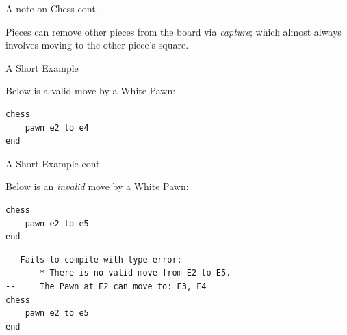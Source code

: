 \documentclass{beamer}
\begin{document}
\begin{frame}{A note on Chess cont.}

Pieces can remove other pieces from the board via \emph{capture}; which almost always involves moving to the other piece's square.

\begin{figure}[h]
    \centering
    \scalebox{0.60}{\showboard}
    \quad
    \scalebox{0.60}{\showboard}
    \label{demonstratecapture}
\end{figure}

\end{frame}

\begin{frame}[fragile]{A Short Example}

Below is a valid move by a White Pawn:

\begin{figure}[h]
    \centering
    \newgame
    \scalebox{0.55}{\showboard}
    \quad
    \scalebox{0.55}{\showboard}
    \label{validpawnmove}
\end{figure}

\pause

\begin{lstlisting}
chess
    pawn e2 to e4
end
\end{lstlisting}

\end{frame}

\begin{frame}[fragile]{A Short Example cont.}

Below is an \emph{invalid} move by a White Pawn:

\begin{figure}[h]
    \centering
    \newgame
    \scalebox{0.55}{\showboard}
    \quad
    \scalebox{0.55}{\showboard}
    \label{badpawnmove}
\end{figure}

\pause

\begin{overprint}

\begin{lstlisting}
chess
    pawn e2 to e5
end
\end{lstlisting}

\begin{lstlisting}
-- Fails to compile with type error:
--     * There is no valid move from E2 to E5.
--     The Pawn at E2 can move to: E3, E4
chess
    pawn e2 to e5
end
\end{lstlisting}

\end{overprint}

\end{frame}
\end{document}
